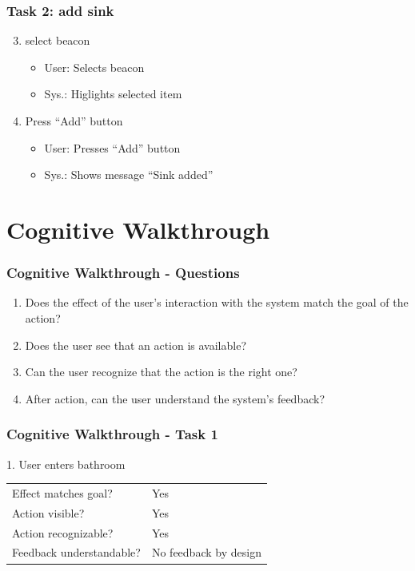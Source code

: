 \documentclass{beamer}
\begin{document}
\begin{frame}
  \frametitle{Task 2: add sink}
  \begin{enumerate} \setcounter{enumi}{2}
    
  \item	select beacon
    \begin{itemize}
    \item User: Selects beacon
    \item Sys.: Higlights selected item
    \end{itemize}
    
  \item	Press ``Add'' button 
    \begin{itemize}         
    \item User: Presses ``Add'' button
    \item Sys.: Shows message ``Sink added''
    \end{itemize}          
  \end{enumerate}
\end{frame}


\section{Cognitive Walkthrough}
\begin{frame}
  \frametitle{Cognitive Walkthrough - Questions}
  \begin{enumerate}
  \item Does the effect of the user's interaction with the system match the goal of the action?
  \item Does the user see that an action is available?
  \item Can the user recognize that the action is the right one?
  \item After action, can the user understand the system's feedback?
  \end{enumerate}
\end{frame}

\begin{frame}
  \frametitle{Cognitive Walkthrough - Task 1}
  1. User enters bathroom

  \vspace{10pt}
  \begin{tabular}{ll}
    Effect matches goal?     & Yes \\
    Action visible?          & Yes \\
    Action recognizable?     & Yes \\
    Feedback understandable? & No feedback by design \\
  \end{tabular}
\end{frame}
\end{document}
